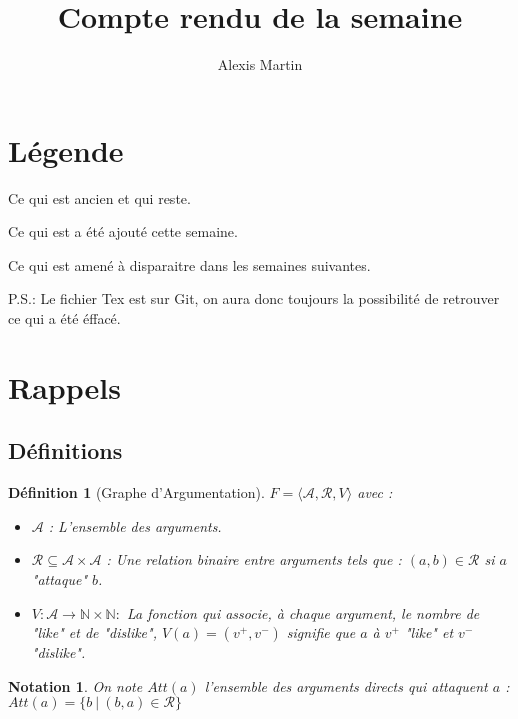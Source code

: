 \documentclass[12pt]{article}
\title{Compte rendu de la semaine}
\author{Alexis Martin}
\theoremstyle{defi}
\newtheorem{definition}{Définition}[section]
\theoremstyle{not}
\newtheorem{notation}{Notation}[section]
\theoremstyle{prob}
\begin{document}
  \maketitle

  \section{Légende}
    \color{black}
      Ce qui est ancien et qui reste.

    \color{blue}
      Ce qui est a été ajouté cette semaine.

    \color{red}
      Ce qui est amené à disparaitre dans les semaines suivantes.

      P.S.: Le fichier Tex est sur Git, on aura donc toujours la possibilité de retrouver ce qui a été éffacé.

  \color{black}
  \section{Rappels}
    \subsection{Définitions}
      \begin{definition}[Graphe d'Argumentation]

        $F = \langle \mathcal{A}, \mathcal{R}, V \rangle$ avec :
        \begin{itemize}
          \item $\mathcal{A}$ : L'ensemble des arguments.
          \item $\mathcal{R} \subseteq \mathcal{A} \times \mathcal{A}$ : Une relation binaire entre arguments tels que : $(a,b) \in \mathcal{R}$ si $a$ "attaque" $b$.
          \item $V: \mathcal{A} \rightarrow \mathbb{N} \times \mathbb{N} :$ La fonction qui associe, à chaque argument, le nombre de "like" et de "dislike", $V(a) = (v^+, v^-)$ signifie que $a$ à $v^+$ "like" et $v^-$ "dislike".
        \end{itemize}
      \end{definition}

      \begin{notation}
        On note $Att(a)$ l'ensemble des arguments directs qui attaquent $a$ :
        $Att(a) = \{b\ |\ (b, a)\in \mathcal{R}\}$
      \end{notation}
\end{document}
